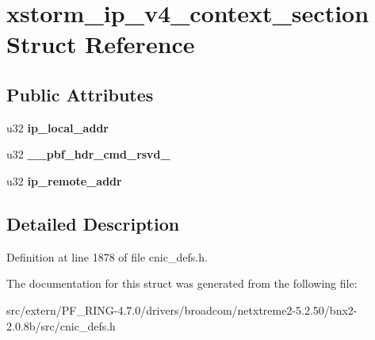 \hypertarget{structxstorm__ip__v4__context__section}{
\section{xstorm\_\-ip\_\-v4\_\-context\_\-section Struct Reference}
\label{structxstorm__ip__v4__context__section}
}
\subsection*{Public Attributes}
\begin{DoxyCompactItemize}
\item 
\hypertarget{structxstorm__ip__v4__context__section_a8879bc49d841e9e90430e32c8c60b820}{
u32 {\bfseries ip\_\-local\_\-addr}}
\label{structxstorm__ip__v4__context__section_a8879bc49d841e9e90430e32c8c60b820}

\item 
\hypertarget{structxstorm__ip__v4__context__section_aec6d46ad906bda1f80a131bdf47c2e39}{
u32 {\bfseries \_\-\_\-pbf\_\-hdr\_\-cmd\_\-rsvd\_}}
\label{structxstorm__ip__v4__context__section_aec6d46ad906bda1f80a131bdf47c2e39}

\item 
\hypertarget{structxstorm__ip__v4__context__section_af013fa69834b0be6a74c9928f1b7e5f4}{
u32 {\bfseries ip\_\-remote\_\-addr}}
\label{structxstorm__ip__v4__context__section_af013fa69834b0be6a74c9928f1b7e5f4}

\end{DoxyCompactItemize}


\subsection{Detailed Description}


Definition at line 1878 of file cnic\_\-defs.h.



The documentation for this struct was generated from the following file:\begin{DoxyCompactItemize}
\item 
src/extern/PF\_\-RING-\/4.7.0/drivers/broadcom/netxtreme2-\/5.2.50/bnx2-\/2.0.8b/src/cnic\_\-defs.h\end{DoxyCompactItemize}
